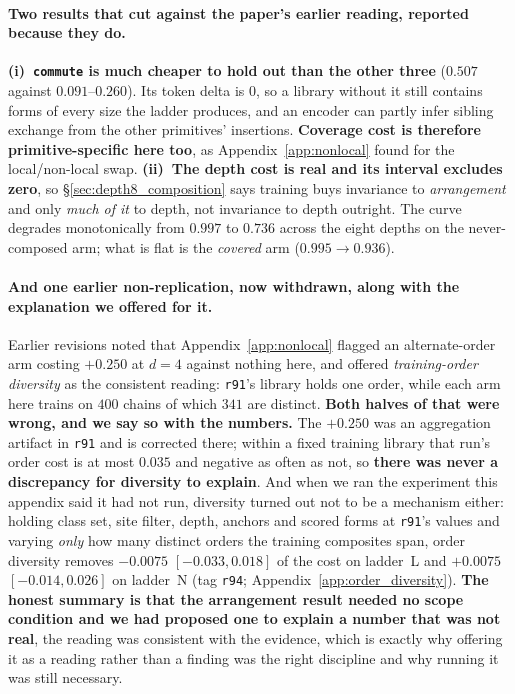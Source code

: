 \paragraph{Two results that cut against the paper's earlier reading, reported because they do.} \textbf{(i)~\texttt{commute} is much cheaper to hold out than the other three} ($0.507$ against $0.091$--$0.260$). Its token delta is $0$, so a library without it still contains forms of every size the ladder produces, and an encoder can partly infer sibling exchange from the other primitives' insertions. \textbf{Coverage cost is therefore primitive-specific here too}, as Appendix~\ref{app:nonlocal} found for the local/non-local swap. \textbf{(ii)~The depth cost is real and its interval excludes zero}, so \S\ref{sec:depth8_composition} says training buys invariance to \emph{arrangement} and only \emph{much of it} to depth, not invariance to depth outright. The curve degrades monotonically from $0.997$ to $0.736$ across the eight depths on the never-composed arm; what is flat is the \emph{covered} arm ($0.995 \to 0.936$).

\paragraph{And one earlier non-replication, now withdrawn, along with the explanation we offered for it.} Earlier revisions noted that Appendix~\ref{app:nonlocal} flagged an alternate-order arm costing $+0.250$ at $d{=}4$ against nothing here, and offered \emph{training-order diversity} as the consistent reading: \texttt{r91}'s library holds one order, while each arm here trains on $400$ chains of which $341$ are distinct. \textbf{Both halves of that were wrong, and we say so with the numbers.} The $+0.250$ was an aggregation artifact in \texttt{r91} and is corrected there; within a fixed training library that run's order cost is at most $0.035$ and negative as often as not, so \textbf{there was never a discrepancy for diversity to explain}. And when we ran the experiment this appendix said it had not run, diversity turned out not to be a mechanism either: holding class set, site filter, depth, anchors and scored forms at \texttt{r91}'s values and varying \emph{only} how many distinct orders the training composites span, order diversity removes $-0.0075$ $[-0.033,0.018]$ of the cost on ladder~L and $+0.0075$ $[-0.014,0.026]$ on ladder~N (tag \texttt{r94}; Appendix~\ref{app:order_diversity}). \textbf{The honest summary is that the arrangement result needed no scope condition and we had proposed one to explain a number that was not real}, the reading was consistent with the evidence, which is exactly why offering it as a reading rather than a finding was the right discipline and why running it was still necessary.

